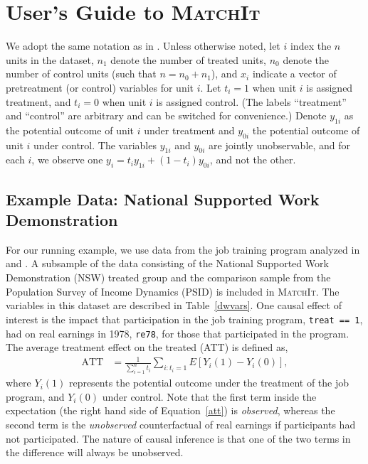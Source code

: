 \documentclass[oneside,letterpaper,titlepage]{article}
\newcommand{\MatchIt}{\textsc{MatchIt}}
\begin{document}
\section{User's Guide to \MatchIt}
\label{methods}

We adopt the same notation as in \citet*{HoImaKin05}. Unless otherwise
noted, let $i$ index the $n$ units in the dataset, $n_1$ denote the
number of treated units, $n_0$ denote the number of control units
(such that $n=n_0+n_1$), and $x_i$ indicate a vector of pretreatment
(or control) variables for unit $i$.  Let $t_i=1$ when unit $i$ is
assigned treatment, and $t_i=0$ when unit $i$ is assigned control.
(The labels ``treatment'' and ``control'' are arbitrary and can be
switched for convenience.)  Denote $y_{1i}$ as the potential outcome
of unit $i$ under treatment and $y_{0i}$ the potential outcome of unit
$i$ under control.  The variables $y_{1i}$ and $y_{0i}$ are jointly
unobservable, and for each $i$, we observe one
$y_i=t_iy_{1i}+(1-t_i)y_{0i}$, and not the other.


\subsection{Example Data: National Supported Work Demonstration}
\label{subsec:lalonde}

For our running example, we use data from the job training program
analyzed in \citet{lalonde86} and \citet{DehWah99}.  A subsample of
the data consisting of the National Supported Work Demonstration (NSW)
treated group and the comparison sample from the Population Survey of
Income Dynamics (PSID) is included in \MatchIt.  The variables in this
dataset are described in Table~\ref{dwvars}.  One causal effect of
interest is the impact that participation in the job training program,
\texttt{treat == 1}, had on real earnings in 1978, \texttt{re78}, for
those that participated in the program.  The average treatment effect
on the treated (ATT) is defined as,
\begin{align}
  \label{att}
  \text{ATT} & = \frac{1}{\sum_{i=1}^n t_i}\sum_{i:t_i=1} E[Y_i(1) - Y_i(0)],
\end{align}
where $Y_i(1)$ represents the potential outcome under the treatment of
the job program, and $Y_i(0)$ under control.  Note that the first term
inside the expectation (the right hand side of Equation~\ref{att}) is
\emph{observed}, whereas the second term is the \emph{unobserved}
counterfactual of real earnings if participants had not participated.
The nature of causal inference is that one of the two terms in the
difference will always be unobserved.  
\end{document}
